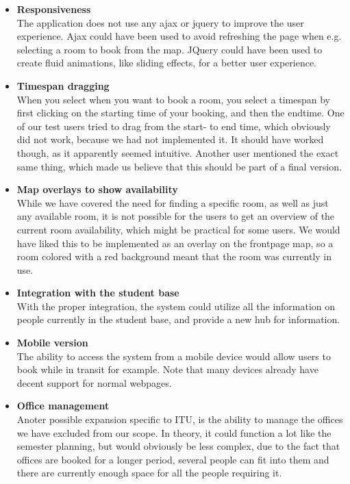 \begin{itemize}
	\item \textbf{Responsiveness}\\
	The application does not use any ajax or jquery to improve the user experience. Ajax could have been used to avoid refreshing the page when e.g. selecting a room to book from the map. JQuery could have been used to create fluid animations, like sliding effects, for a better user experience. 
	
	\item \textbf{Timespan dragging}\\
	When you select when you want to book a room, you select a timespan by first clicking on the starting time of your booking, and then the endtime. One of our test users tried to drag from the start- to end time, which obviously did not work, because we had not implemented it. It should have worked though, as it apparently seemed intuitive. Another user mentioned the exact same thing, which made us believe that this should be part of a final version.
	
	\item \textbf{Map overlays to show availability}\\
	While we have covered the need for finding a specific room, as well as just any available room, it is not possible for the users to get an overview of the current room availability, which might be practical for some users. We would have liked this to be implemented as an overlay on the frontpage map, so a room colored with a red background meant that the room was currently in use.
	
	\item \textbf{Integration with the student base}\\
	With the proper integration, the system could utilize all the information on people currently in the student base, and provide a new hub for information.
	
	\item \textbf{Mobile version}\\
	The ability to access the system from a mobile device would allow users to book while in transit for example. Note that many devices already have decent support for normal webpages.
	
	\item \textbf{Office management}\\
	Anoter possible expansion specific to ITU, is the ability to manage the offices we have excluded from our scope. In theory, it could function a lot like the semester planning, but would obviously be less complex, due to the fact that offices are booked for a longer period, several people can fit into them and there are currently enough space for all the people requiring it.
	

\end{itemize}
